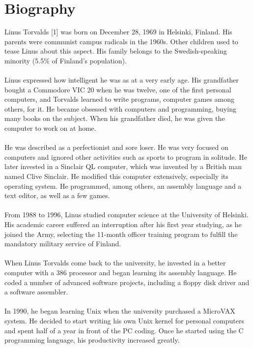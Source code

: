 \documentclass[11pt]{article}
\begin{document}
\section{Biography}
Linus Torvalds [1] was born on December 28, 1969 in Helsinki, Finland. His parents were communist campus radicals in the 1960s. Other children used to tease Linus about this aspect.  His family belongs to the Swedish-speaking minority (5.5\% of Finland's population).\\ 
\\
Linus expressed how intelligent he was as at a very early age. His grandfather bought a Commodore VIC 20 when he was twelve, one of the first personal computers, and Torvalds learned to write programs, computer games among others, for it. He became obsessed with computers and programming, buying many books on the subject. When his grandfather died, he was given the computer to work on at home.\\
\\
He was described as a perfectionist and sore loser. He was very focused on computers and ignored other activities such as sports to program in solitude. He later invested in a Sinclair QL computer, which was invented by a British man named Clive Sinclair. He modified this computer extensively, especially its operating system. He programmed, among others, an assembly language and a text editor, as well as a few games.\\
\\
From 1988 to 1996, Linus studied computer science at the University of Helsinki. His academic career suffered an interruption after his first year studying, as he joined the Army, selecting the 11-month officer training program to fulfill the mandatory military service of Finland.\\
\\
When Linus Torvalds come back to the university, he invested in a better computer with a 386 processor and began learning its assembly language. He coded a number of advanced software projects, including a floppy disk driver and a software assembler.\\
\\
In 1990, he began learning Unix when the university purchased a MicroVAX system. He decided to start writing his own Unix kernel for personal computers and spent half of a year in front of the PC coding. Once he started using the C programming language, his productivity increased greatly.\\
\\
\end{document}
